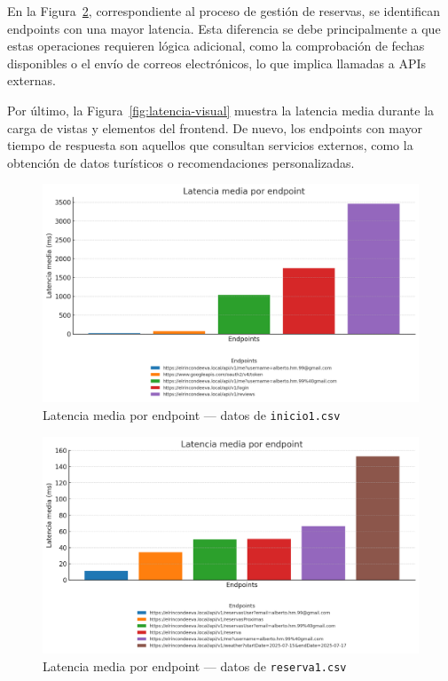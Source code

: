 En la Figura~\ref{fig:latencia-reserva}, correspondiente al proceso de gestión de reservas, se identifican endpoints con una mayor latencia. Esta diferencia se debe principalmente a que estas operaciones requieren lógica adicional, como la comprobación de fechas disponibles o el envío de correos electrónicos, lo que implica llamadas a APIs externas.

Por último, la Figura~\ref{fig:latencia-visual} muestra la latencia media durante la carga de vistas y elementos del frontend. De nuevo, los endpoints con mayor tiempo de respuesta son aquellos que consultan servicios externos, como la obtención de datos turísticos o recomendaciones personalizadas.

\begin{figure}[h!tb]
  \centering
  \includegraphics[width=1\textwidth]{figs/inicioyreviews.png}
  \caption{Latencia media por endpoint — datos de \texttt{inicio1.csv}}
  \label{fig:latencia-inicio}
\end{figure}

\begin{figure}[h!tb]
  \centering
  \includegraphics[width=1\textwidth]{figs/tiempoyreservas.png}
  \caption{Latencia media por endpoint — datos de \texttt{reserva1.csv}}
  \label{fig:latencia-reserva}
\end{figure}

